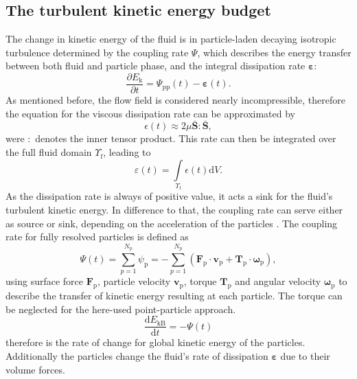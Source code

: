 \documentclass[11pt,a4paper,openany,oneside,parskip=half*]{article}
\renewcommand*\vec[1]{\boldsymbol{#1}}
\begin{document}
\subsection{The turbulent kinetic energy budget}
The change in kinetic energy of the fluid is in particle-laden decaying isotropic turbulence determined by the coupling rate $\Psi$, which describes the energy transfer between both fluid and particle phase, and the integral dissipation rate $\vec{\varepsilon}$:
\begin{equation}
\frac{\partial E_\mathrm{k}}{\partial t} = \Psi_\mathrm{pp} (t) - \vec{\varepsilon} (t).
\end{equation}
As mentioned before, the flow field is considered nearly incompressible, therefore the equation  for the viscous dissipation rate can be approximated by
\begin{equation}
 \epsilon (t) \approx 2 \mu \vec{\bar{S}}\vec{:}\vec{\bar{S}},
\end{equation}
were $\vec{:}$ denotes the inner tensor product. This rate can then be integrated over the full fluid domain $\Upsilon_\mathrm{f}$, leading to 
\begin{equation}
\varepsilon (t) = \int\limits_{\Upsilon_\mathrm{f}} \epsilon(t) \mathrm{d}V.
\end{equation}
As the dissipation rate is always of positive value, it acts a sink for the fluid's turbulent kinetic energy. In difference to that, the coupling rate can serve either as source or sink, depending on the acceleration of the particles \cite{mechanismsoftwowaycoupling}. The coupling rate for fully resolved particles is defined as
\begin{equation}
\Psi (t) = \sum_{p=1}^{N_\mathrm{p}} \psi_\mathrm{p}= - \sum_{p=1}^{N_\mathrm{p}} (\vec{F}_\mathrm{p} \cdot \vec{v}_\mathrm{p} + \vec{T}_\mathrm{p} \cdot \vec{\omega}_\mathrm{p}),
\end{equation}
using surface force $\vec{F}_\mathrm{p}$, particle velocity $\vec{v}_\mathrm{p}$, torque $\vec{T}_\mathrm{p}$ and angular velocity $\vec{\omega}_\mathrm{p}$ to describe the transfer of kinetic energy resulting at each particle. The torque can be neglected for the here-used point-particle approach.
\begin{equation}
\frac{\mathrm{d}E_\mathrm{kB}}{\mathrm{d}t} = - \Psi (t)
\end{equation}
therefore is the rate of change for global kinetic energy of the particles.
Additionally the particles change the fluid's rate of dissipation $\vec{\varepsilon}$ due to their volume forces. 
\end{document}
